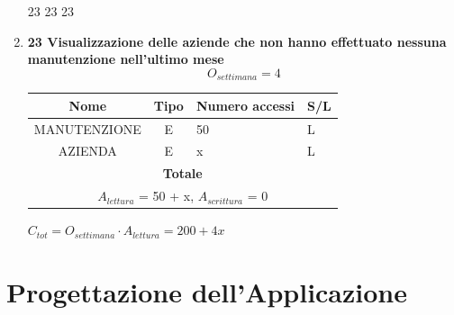 \documentclass[12pt,a4paper]{report}
\begin{document}
\begin{enumerate}[label=\textbf{\arabic*)}]
23 23 23
\item \textbf{23 Visualizzazione delle aziende che non hanno effettuato nessuna manutenzione            nell’ultimo mese} \\
    \[ {O_{settimana} = 4} \]
    \begin{table}[H]
    \centering
    \begin{tabular}{|c|c|l|l|}
    \hline
    \textbf{Nome} & \textbf{Tipo} & \textbf{Numero accessi} & \textbf{S/L} \\
    \hline
    MANUTENZIONE & E & 50 & L \\ 
    \hline
    AZIENDA & E & x & L \\ 
    \hline
    \multicolumn{4}{c}{\textbf{Totale}} \\    
    \multicolumn{4}{c}{${A_{lettura}}$ = 50 + x, ${A_{scrittura}}$ = 0} \\
    \hline
    \end{tabular}
    \end{table}
    \begin{center}
    ${C_{tot} = {O_{settimana}}\cdot {A_{lettura}} = 200 + 4x}$
    \end{center}

\end{enumerate}

\chapter{Progettazione dell'Applicazione}
\end{document}
